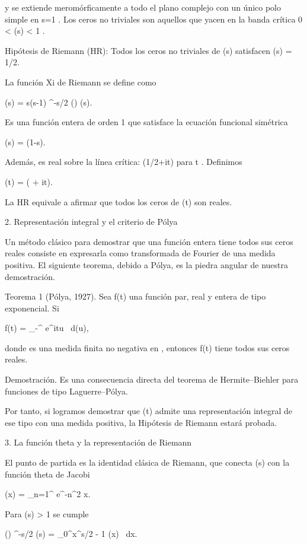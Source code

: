 \documentclass[12pt,a4paper]{book}
\begin{document}
y se extiende meromórficamente a todo el plano complejo con un único polo simple en  s=1 .
Los ceros no triviales son aquellos que yacen en la banda crítica  0 < \Re(s) < 1 .

Hipótesis de Riemann (HR): Todos los ceros no triviales de \zeta(s) satisfacen \Re(s) = 1/2.

La función Xi de Riemann se define como

\xi(s) =  s(s-1) \pi^{-s/2} \Gamma\!\left(\right) \zeta(s).
\]  

Es una función entera de orden 1 que satisface la ecuación funcional simétrica

\xi(s) = \xi(1-s).
\]  

Además, es real sobre la línea crítica: \xi(1/2+it) \in {} para t \in {}.
Definimos

\Xi(t) = \xi\!\left( + it\right).
\]  

La HR equivale a afirmar que todos los ceros de \Xi(t) son reales.

2. Representación integral y el criterio de Pólya

Un método clásico para demostrar que una función entera tiene todos sus ceros reales consiste en expresarla como transformada de Fourier de una medida positiva. El siguiente teorema, debido a Pólya, es la piedra angular de nuestra demostración.

Teorema 1 (Pólya, 1927). Sea f(t) una función par, real y entera de tipo exponencial. Si

f(t) = \int_{-\infty}^{\infty} e^{itu} \, d\nu(u),
\]  

donde \nu es una medida finita no negativa en , entonces f(t) tiene todos sus ceros reales.

Demostración. Es una consecuencia directa del teorema de Hermite–Biehler para funciones de tipo Laguerre–Pólya.

Por tanto, si logramos demostrar que \Xi(t) admite una representación integral de ese tipo con una medida \nu positiva, la Hipótesis de Riemann estará probada.

3. La función theta y la representación de Riemann

El punto de partida es la identidad clásica de Riemann, que conecta \zeta(s) con la función theta de Jacobi

\psi(x) = \sum_{n=1}^{\infty} e^{-\pi n^2 x}.
\]  

Para \Re(s) > 1 se cumple

\Gamma\!\left(\right) \pi^{-s/2} \zeta(s) = \int_0^\infty x^{s/2 - 1} \psi(x) \, dx.
\]  
\end{document}
